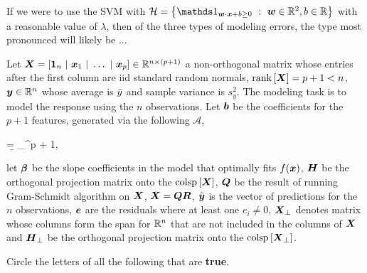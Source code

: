 \documentclass[12pt]{article}
\begin{document}
 If we were to use the SVM with $\mathcal{H} = \braces{\indic{\w \cdot \x + b\geq 0}~ :~ \w \in \reals^2, b \in \reals}$ with a reasonable value of $\lambda$, then of the three types of modeling errors, the type most pronounced will likely be ... 


\eenum


\problem Let $\boldsymbol{X} = \left[\boldsymbol{1}_n~|~\boldsymbol{x}_1~|~\ldots~|~\boldsymbol{x}_p\right] \in \mathbb{R}^{n \times (p +1)}$  a non-orthogonal matrix whose entries after the first column are iid standard random normals, $\text{rank}\left[\boldsymbol{X}\right] = p + 1 < n$,  $\boldsymbol{y} \in \mathbb{R}^n$ whose average is $\bar{y}$ and sample variance is $s^2_y$. The modeling task is to model the response using the $n$ observations. Let $\boldsymbol{b}$ be the coefficients for the $p+1$ features, generated via the following $\mathcal{A}$,

\beqn
\b = \displaystyle\argmin_{\w \in \reals^{p + 1}}\braces{(\y - \X\w)^\top (\y - \X\w)},
\eeqn


\noindent let $\boldsymbol{\beta}$ be the slope coefficients in the model that optimally fits $f(\boldsymbol{x})$, $\boldsymbol{H}$ be the orthogonal projection matrix onto the $\text{colsp}\left[\boldsymbol{X}\right]$, $\boldsymbol{Q}$ be the result of running Gram-Schmidt algorithm on $\boldsymbol{X}$, $\boldsymbol{X} = \boldsymbol{Q}\boldsymbol{R}$, $\hat{\boldsymbol{y}}$ is the vector of predictions for the $n$ observations, $\boldsymbol{e}$ are the residuals where at least one $e_i \neq 0$, $\boldsymbol{X}_\perp$ denotes matrix whose columns form the span for $\mathbb{R}^n$ that are not included in the columns of $\boldsymbol{X}$ and $\boldsymbol{H}_\perp$ be the orthogonal projection matrix onto the $\text{colsp}\left[\boldsymbol{X}_\perp\right]$.

\benum

 Circle the letters of all the following that are \textbf{true}.
\end{document}
